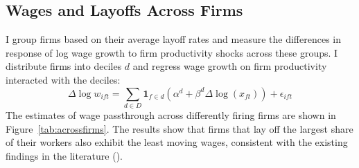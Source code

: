 \subsection*{Wages and Layoffs Across Firms}
I group firms based on their average layoff rates and measure the differences in response of log wage growth to firm productivity shocks across these groups. I distribute firms into deciles $d$ and regress wage growth on firm productivity interacted with the deciles:
\[ \Delta \log w_{ift} = \sum_{d \in D} \mathbf{1}_{f \in d}(\alpha^d + \beta^{d}\Delta \log(x_{ft})) + \epsilon_{ift}\]
The estimates of wage passthrough across differently firing firms are shown in Figure~\ref{tab:acrossfirms}. The results show that firms that lay off the largest share of their workers also exhibit the least moving wages, consistent with the existing findings in the literature (\textcite{enrlich2024}). 

